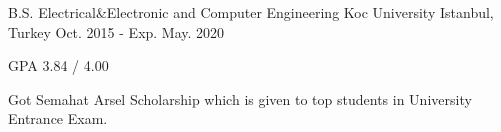 

\begin{cventries}

  \cventry
    {B.S. Electrical\&Electronic and Computer Engineering} %
    {Koc University } %
    {Istanbul, Turkey} %
    {Oct. 2015 - Exp. May. 2020} %
    {
      \begin{cvitems} %
        \item {GPA 3.84 / 4.00}
        \item {Got Semahat Arsel Scholarship which is given to top students in University Entrance Exam.}
      \end{cvitems}
    }

\end{cventries}
